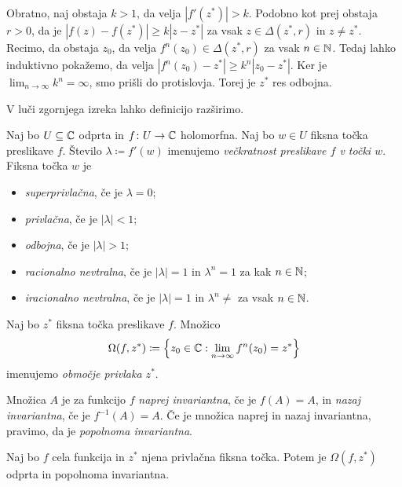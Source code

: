 \begin{dokaz}
    Obratno, naj obstaja \(k > 1\), da velja \(|f' (z^*)| > k\). Podobno kot prej obstaja \(r > 0\), da je \(|f (z) - f (z^*)| \geq k |z - z^*|\) za vsak \(z \in \Delta (z^*, r)\) in \(z \neq z^*\). Recimo, da obstaja \(z_0\), da velja \(f^n (z_0) \in \Delta (z^*, r)\) za vsak \(n \in \mathbb N\). Tedaj lahko induktivno pokažemo, da velja \(|f^n (z_0) - z^*| \geq k^n |z_0 - z^*|\). Ker je \(\lim_{n \to \infty} k^n = \infty\), smo prišli do protislovja. Torej je \(z^*\) res odbojna.
\end{dokaz}

\noindent V luči zgornjega izreka lahko definicijo razširimo.

\begin{definicija}
    Naj bo \(U \subseteq \mathbb C\) odprta in \(f \colon U \to \mathbb C\) holomorfna. Naj bo \(w \in U\) fiksna točka preslikave \(f\). Število \(\lambda \coloneq f' (w)\) imenujemo \emph{večkratnost preslikave \(f\) v točki \(w\)}. Fiksna točka \(w\) je
    \begin{itemize}
        \item \emph{superprivlačna}, če je \(\lambda = 0\);
        \item \emph{privlačna}, če je \(|\lambda| < 1\);
        \item \emph{odbojna}, če je \(|\lambda| > 1\);
        \item \emph{racionalno nevtralna}, če je \(|\lambda| = 1\) in \(\lambda^n = 1\) za kak \(n \in \mathbb N\);
        \item \emph{iracionalno nevtralna}, če je \(|\lambda| = 1\) in \(\lambda^n \neq\) za vsak \(n \in \mathbb N\).
    \end{itemize}
\end{definicija}

\begin{definicija}
    Naj bo \(z^*\) fiksna točka preslikave \(f\). Množico
    \[\Omega (f, z^*) \coloneq \left\{ z_0 \in \mathbb C : \lim_{n \to \infty} f^n (z_0) = z^* \right\}\]
    imenujemo \emph{območje privlaka \(z^*\)}.
\end{definicija}

Množica \(A\) je za funkcijo \(f\) \emph{naprej invariantna}, če je \(f (A) = A\), in \emph{nazaj invariantna}, če je \(f^{-1} (A) = A\). Če je množica naprej in nazaj invariantna, pravimo, da je \emph{popolnoma invariantna}.

\begin{izrek}
    Naj bo \(f\) cela funkcija in \(z^*\) njena privlačna fiksna točka. Potem je \(\Omega (f, z^*)\) odprta in popolnoma invariantna.
\end{izrek}

